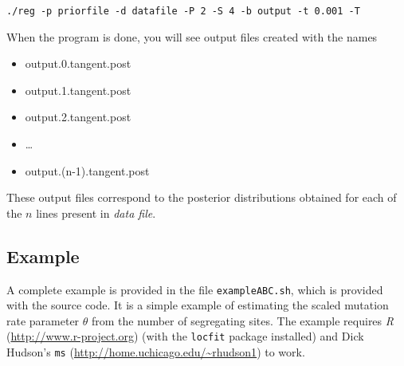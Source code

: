 \documentclass{article}
\begin{document}
\texttt{./reg -p priorfile -d datafile -P 2 -S 4 -b output -t 0.001 -T}

When the program is done, you will see output files created with the names
\begin{itemize}
\item output.0.tangent.post
\item output.1.tangent.post
\item output.2.tangent.post
\item \ldots
\item output.(n-1).tangent.post
\end{itemize}
These output files correspond to the posterior distributions obtained for each of the $n$ lines present in \textit{data file}.

\subsection*{Example}
A complete example is provided in the file \texttt{exampleABC.sh}, which is provided with the source code.  It is a simple example of estimating the scaled mutation rate parameter $\theta$ from the number of segregating sites.  The example requires \textit{R} (\url{http://www.r-project.org}) (with the \texttt{locfit} package installed) and Dick Hudson's \texttt{ms} (\url{http://home.uchicago.edu/~rhudson1}) to work.



\end{document}

